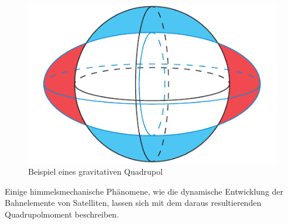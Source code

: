 \begin{figure}[h!]
    \centering
    \includegraphics[width=\linewidth]{papers/planet/pictures/Quadroearth.pdf}
    \caption{Beispiel eines gravitativen Quadrupol
        \label{planet:fig:quadroearth}}
\end{figure}


Einige himmelsmechanische Phänomene, wie die dynamische Entwicklung der Bahnelemente von Satelliten, lassen sich mit dem daraus resultierenden Quadrupolmoment beschreiben.
